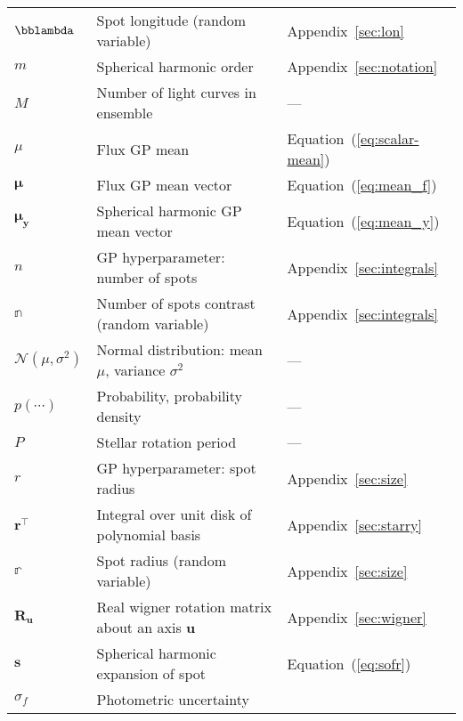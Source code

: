 \begin{center}
\begin{longtable}{W{c}{1cm} W{l}{9cm} W{l}{2cm}}
        $\bblambda$
         & Spot longitude (random variable)
         & Appendix~\ref{sec:lon}
        \\
        $m$
         & Spherical harmonic order
         & Appendix~\ref{sec:notation}
        \\
        $M$
         & Number of light curves in ensemble
         & ---
        \\
        $\mu$
         & Flux GP mean
         & Equation~(\ref{eq:scalar-mean})
        \\
        $\pmb{\mu}$
         & Flux GP mean vector
         & Equation~(\ref{eq:mean_f})
        \\
        $\pmb{\mu}_\mathbf{y}$
         & Spherical harmonic GP mean vector
         & Equation~(\ref{eq:mean_y})
        \\
        $n$
         & GP hyperparameter: number of spots
         & Appendix~\ref{sec:integrals}
        \\
        $\mathbb{n}$
         & Number of spots contrast (random variable)
         & Appendix~\ref{sec:integrals}
        \\
        $\mathcal{N}(\mu, \sigma^2)$
         & Normal distribution: mean $\mu$, variance $\sigma^2$
         & ---
        \\
        $p(\cdots)$
         & Probability, probability density
         & ---
        \\
        $P$
         & Stellar rotation period
         & ---
        \\
        $r$
         & GP hyperparameter: spot radius
         & Appendix~\ref{sec:size}
        \\
        $\mathbf{r}^\top$
         & Integral over unit disk of polynomial basis
         & Appendix~\ref{sec:starry}
        \\
        $\mathbb{r}$
         & Spot radius (random variable)
         & Appendix~\ref{sec:size}
        \\
        $\mathbf{R}_\mathbf{u}$
         & Real wigner rotation matrix about an axis $\mathbf{u}$
         & Appendix~\ref{sec:wigner}
        \\
        $\mathbf{s}$
         & Spherical harmonic expansion of spot
         & Equation~(\ref{eq:sofr})
        \\
        $\sigma_f$
         & Photometric uncertainty

\end{longtable}
\end{center}

